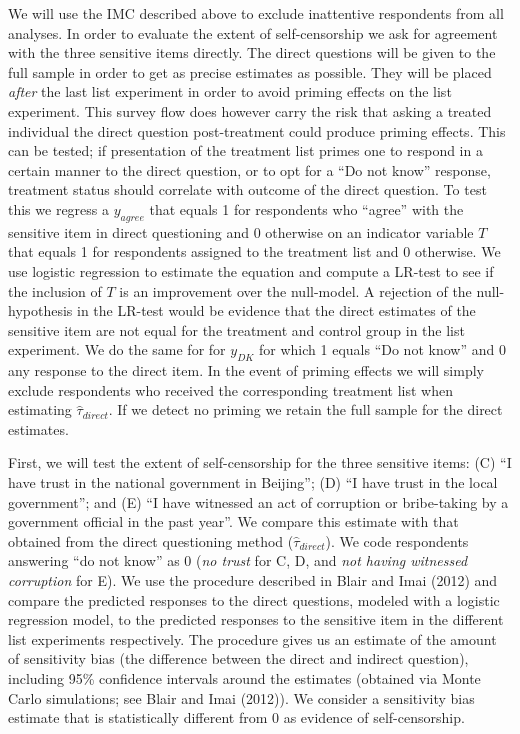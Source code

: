 \documentclass[]{article}
\begin{document}
We will use the IMC described above to exclude inattentive respondents
from all analyses. In order to evaluate the extent of self-censorship we
ask for agreement with the three sensitive items directly. The direct
questions will be given to the full sample in order to get as precise
estimates as possible. They will be placed \emph{after} the last list
experiment in order to avoid priming effects on the list experiment.
This survey flow does however carry the risk that asking a treated
individual the direct question post-treatment could produce priming
effects. This can be tested; if presentation of the treatment list
primes one to respond in a certain manner to the direct question, or to
opt for a ``Do not know'' response, treatment status should correlate
with outcome of the direct question. To test this we regress a
\(y_{agree}\) that equals 1 for respondents who ``agree'' with the
sensitive item in direct questioning and 0 otherwise on an indicator
variable \(T\) that equals 1 for respondents assigned to the treatment
list and 0 otherwise. We use logistic regression to estimate the
equation and compute a LR-test to see if the inclusion of \(T\) is an
improvement over the null-model. A rejection of the null-hypothesis in
the LR-test would be evidence that the direct estimates of the sensitive
item are not equal for the treatment and control group in the list
experiment. We do the same for for \(y_{DK}\) for which 1 equals ``Do
not know'' and 0 any response to the direct item. In the event of
priming effects we will simply exclude respondents who received the
corresponding treatment list when estimating \(\hat{\tau}_{direct}\). If
we detect no priming we retain the full sample for the direct estimates.

First, we will test the extent of self-censorship for the three
sensitive items: (C) ``I have trust in the national government in
Beijing''; (D) ``I have trust in the local government''; and (E) ``I
have witnessed an act of corruption or bribe-taking by a government
official in the past year''. We compare this estimate with that obtained
from the direct questioning method (\(\hat{\tau}_{direct}\)). We code
respondents answering ``do not know'' as 0 (\emph{no trust} for C, D,
and \emph{not having witnessed corruption} for E). We use the procedure
described in Blair and Imai (2012) and compare the predicted responses
to the direct questions, modeled with a logistic regression model, to
the predicted responses to the sensitive item in the different list
experiments respectively. The procedure gives us an estimate of the
amount of sensitivity bias (the difference between the direct and
indirect question), including 95\% confidence intervals around the
estimates (obtained via Monte Carlo simulations; see Blair and Imai
(2012)). We consider a sensitivity bias estimate that is statistically
different from 0 as evidence of self-censorship.
\end{document}
